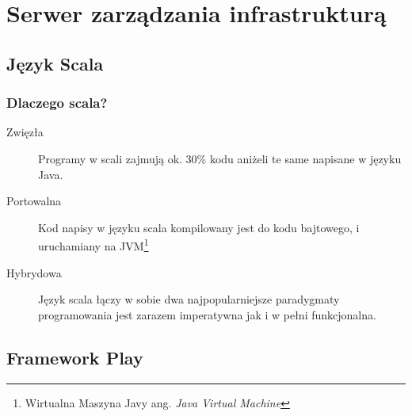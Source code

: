 \section{Serwer zarządzania infrastrukturą}

\subsection{Język Scala}

\subsubsection{Dlaczego scala?}

\begin{description}
	\item[Zwięzła] \hfill \par
		Programy w scali zajmują ok. 30\% kodu aniżeli te same napisane w języku Java.
	\item[Portowalna] \hfill \par
		Kod napisy w języku scala kompilowany jest do kodu bajtowego, i uruchamiany na JVM\footnote{Wirtualna Maszyna Javy ang. \emph{Java Virtual Machine}}
	\item[Hybrydowa] \hfill \par
		Język scala łączy w sobie dwa najpopularniejsze paradygmaty programowania jest zarazem imperatywna jak i w pełni funkcjonalna.
\end{description}

\subsection{Framework Play}

